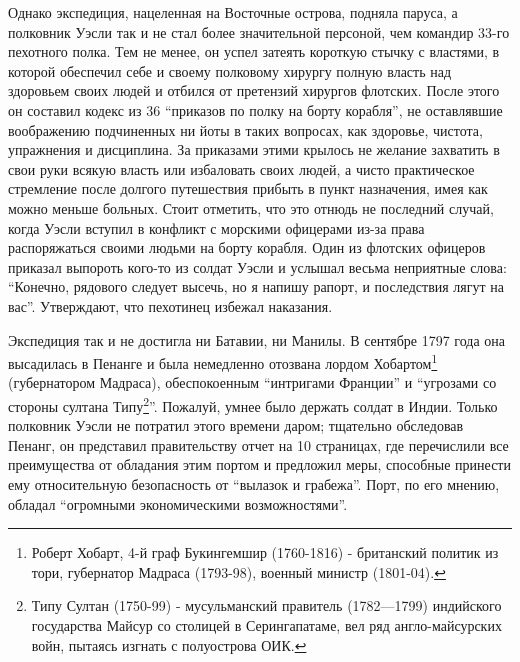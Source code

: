 \documentclass[
  oneside,
  12pt,
  titlepage]{book}
\begin{document}
Однако экспедиция, нацеленная на Восточные острова, подняла паруса, а полковник Уэсли так и не стал более значительной персоной, чем командир 33-го пехотного полка. Тем не менее, он успел затеять короткую стычку с властями, в которой обеспечил себе и своему полковому хирургу полную власть над здоровьем своих людей и отбился от претензий хирургов флотских. После этого он составил кодекс из 36 ``приказов по полку на борту корабля'', не оставлявшие воображению подчиненных ни йоты в таких вопросах, как здоровье, чистота, упражнения и дисциплина. За приказами этими крылось не желание захватить в свои руки всякую власть или избаловать своих людей, а чисто практическое стремление после долгого путешествия прибыть в пункт назначения, имея как можно меньше больных. Стоит отметить, что это отнюдь не последний случай, когда Уэсли вступил в конфликт с морскими офицерами из-за права распоряжаться своими людьми на борту корабля. Один из флотских офицеров приказал выпороть кого-то из солдат Уэсли и услышал весьма неприятные слова: ``Конечно, рядового следует высечь, но я напишу рапорт, и последствия лягут на вас''. Утверждают, что пехотинец избежал наказания.

Экспедиция так и не достигла ни Батавии, ни Манилы. В сентябре 1797 года она высадилась в Пенанге и была немедленно отозвана лордом Хобартом\footnote{Роберт Хобарт, 4-й граф Букингемшир (1760-1816) - британский политик из тори, губернатор Мадраса (1793-98), военный министр (1801-04).} (губернатором Мадраса), обеспокоенным ``интригами Франции'' и ``угрозами со стороны султана Типу\footnote{Типу Султан (1750-99) - мусульманский правитель (1782---1799) индийского государства Майсур со столицей в Серингапатаме, вел ряд англо-майсурских войн, пытаясь изгнать с полуострова ОИК.}''. Пожалуй, умнее было держать солдат в Индии. Только полковник Уэсли не потратил этого времени даром; тщательно обследовав Пенанг, он представил правительству отчет на 10 страницах, где перечислили все преимущества от обладания этим портом и предложил меры, способные принести ему относительную безопасность от ``вылазок и грабежа''. Порт, по его мнению, обладал ``огромными экономическими возможностями''.
\end{document}
